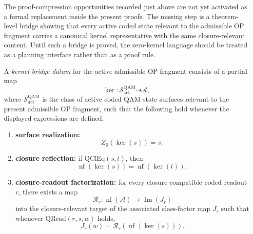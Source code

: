 \begin{remark}\label{rem:qam-zero-current-limit}
The proof-compression opportunities recorded just above are not yet activated as a formal replacement inside the present proofs. The missing step is a theorem-level bridge showing that every active coded state relevant to the admissible OP fragment carries a canonical kernel representative with the same closure-relevant content. Until such a bridge is proved, the zero-kernel language should be treated as a planning interface rather than as a proof rule.
\end{remark}



\begin{definition}\label{def:qam-kernel-bridge-datum}
A \emph{kernel bridge datum} for the active admissible OP fragment consists of a partial map
\[
\operatorname{ker}:\mathcal S^{\mathrm{QAM}}_{\mathrm{act}} \dashrightarrow \mathcal A,
\]
where $\mathcal S^{\mathrm{QAM}}_{\mathrm{act}}$ is the class of active coded QAM-state surfaces relevant to the present admissible OP fragment, such that the following hold whenever the displayed expressions are defined.
\begin{enumerate}
\item \textbf{surface realization:}
\[
Z_0(\operatorname{ker}(s))=s;
\]
\item \textbf{closure reflection:} if $\mathrm{QClEq}(s,t)$, then
\[
\operatorname{nf}(\operatorname{ker}(s))=\operatorname{nf}(\operatorname{ker}(t));
\]
\item \textbf{closure-readout factorization:} for every closure-compatible coded readout $r$, there exists a map
\[
\mathcal R_r: \operatorname{nf}(\mathcal A) \to \operatorname{Im}(J_r)
\]
into the closure-relevant target of the associated class-factor map $J_r$ such that whenever $\mathrm{QRead}(r,s,w)$ holds,
\[
J_r(w)=\mathcal R_r(\operatorname{nf}(\operatorname{ker}(s))).
\]
\end{enumerate}
\end{definition}

